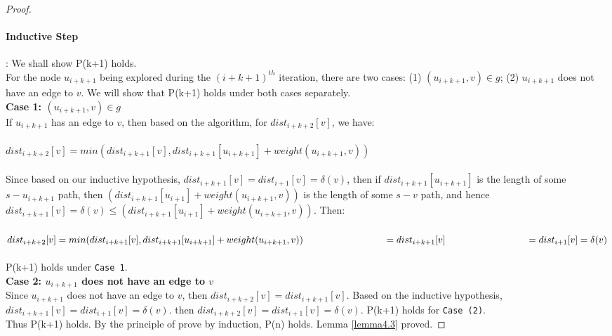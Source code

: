 \begin{proof}
\paragraph*{Inductive Step}: We shall show P(k+1) holds. 
\\
For the node $u_{i+k+1}$ being explored during the $(i+k+1)^{th}$ iteration, there are two cases: (1) $(u_{i+k+1}, v) \in g$; (2) $u_{i+k+1}$ does not have an edge to $v$. We will show that P(k+1) holds under both cases separately. 
\\
\textbf{Case 1: $(u_{i+k+1}, v) \in g$}
\\
If $u_{i+k+1}$ has an edge to $v$, then based on the algorithm, for $dist_{i+k+2}[v]$, we have: 
\\\\
  \tab $dist_{i+k+2}[v] = min(dist_{i+k+1}[v], dist_{i+k+1}[u_{i+k+1}] + weight(u_{i+k+1}, v))$
\\\\
Since based on our inductive hypothesis, $dist_{i+k+1}[v] = dist_{i+1}[v] = \delta(v)$, then if $dist_{i+k+1}[u_{i+k+1}] $ is the length of some $s-u_{i+k+1}$ path, then $(dist_{i+k+1}[u_{i+1}] + weight(u_{i+k+1}, v))$ is the length of some $s-v$ path, and hence $dist_{i+k+1}[v] = \delta(v) \leq (dist_{i+k+1}[u_{i+1}] + weight(u_{i+k+1}, v))$. Then: 
\\\\
 \tab $dist_{i+k+2}[v] = min(dist_{i+k+1}[v], dist_{i+k+1}[u_{i+k+1}] + weight(u_{i+k+1}, v)) \\
 \tab\tab\tab = dist_{i+k+1}[v]\\
 \tab\tab\tab = dist_{i+1}[v] = \delta(v)$
\\\\
P(k+1) holds under \texttt{Case 1}. 
\\
\textbf{Case 2: $u_{i+k+1}$ does not have an edge to $v$}
\\
Since $u_{i+k+1}$ does not have an edge to $v$, then $dist_{i+k+2}[v] = dist_{i+k+1}[v]$. Based on the inductive hypothesis, $dist_{i+k+1}[v] = dist_{i+1}[v] = \delta(v)$. then $dist_{i+k+2}[v] = dist_{i+1}[v] = \delta(v)$. P(k+1) holds for \texttt{Case (2)}. 
\\
Thus P(k+1) holds. By the principle of prove by induction, P(n) holds. Lemma \ref{lemma4.3} proved. 

\end{proof}
